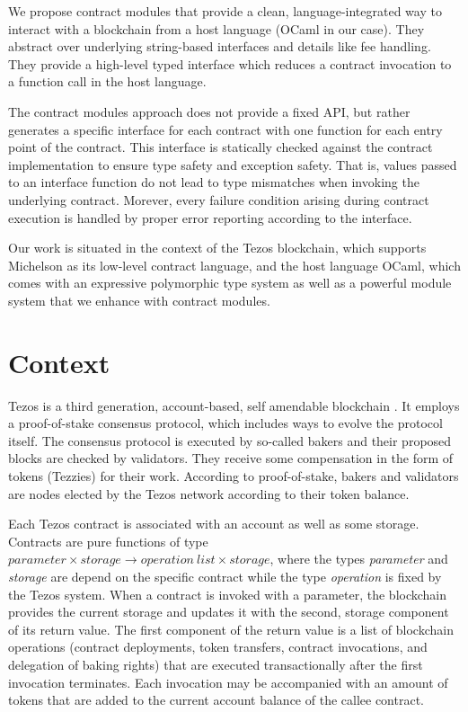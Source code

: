 \documentclass[a4paper,USenglish,american,cleveref, autoref, thm-restate]{oasics-v2021}
\begin{document}
We propose contract modules that provide a clean, language-integrated
way to interact with a blockchain from a host language (OCaml in our
case). They abstract over underlying string-based interfaces and
details like fee handling. They provide a high-level typed interface
which reduces a contract invocation to a function call in the host
language.

The contract modules approach does not provide a fixed API, but
rather generates a specific interface for each contract with one
function for each entry point of the contract. This
interface is statically checked against the contract implementation to
ensure type safety and exception safety. That is, values passed to an
interface function do not lead to type mismatches when invoking the
underlying contract. Morever, every failure condition arising during
contract execution is handled by proper error reporting according to
the interface.

Our work is situated in the context of the Tezos blockchain, which
supports Michelson as its low-level contract language, and the
host language OCaml, which comes with an expressive polymorphic type system
as well as a powerful module system that we
enhance with contract modules. 

\section{Context}
\label{sec:context}

Tezos is a third generation, account-based, self amendable
blockchain \cite{tezos-whitepaper}. It employs a proof-of-stake consensus protocol, which
includes ways to evolve the protocol itself. The consensus protocol is
executed by so-called bakers and their proposed blocks are checked by
validators. They receive some compensation in the form of
tokens (Tezzies) for their work. According to proof-of-stake,
bakers and validators are nodes elected by the Tezos network
according to their token balance. 

Each Tezos contract is associated with an account as well as some
storage. Contracts are pure functions of type $\mathit{parameter} \times
\mathit{storage} \to \mathit{operation\ list} \times
\mathit{storage}$, where the types \textit{parameter} and
\textit{storage} are depend on the specific contract while the type
\textit{operation} is fixed by the Tezos system. When a contract is invoked with a parameter,
the blockchain provides the current storage and updates it with the
second, storage component of its return value. The first component of
the return value is a list of blockchain operations (contract deployments, token
transfers, contract invocations, and delegation of baking rights) that
are executed transactionally after the first invocation terminates. Each invocation may be
accompanied with an amount of tokens that are added to the current
account balance of the callee contract.
\end{document}
